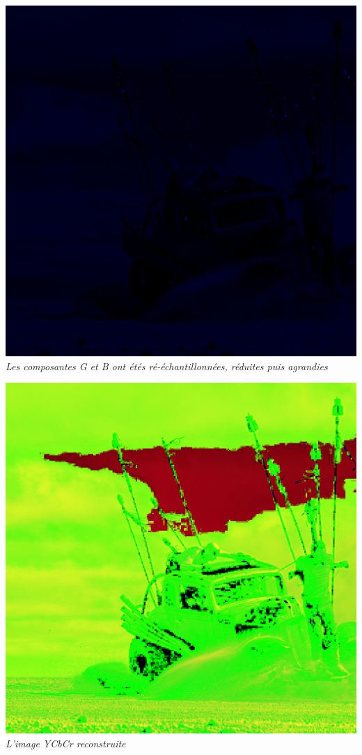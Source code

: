 \documentclass[a4paper,11pt]{article}
\begin{document}
\begin{center}
\includegraphics[scale=0.2]{./imgs/madmaxY3B.png}\\
\textit{Les composantes G et B ont étés ré-échantillonnées, réduites puis agrandies}
\end{center}

\begin{center}
\includegraphics[scale=0.5]{./imgs/madmaxYCompRGB.png}\\
\textit{L'image YCbCr reconstruite}
\end{center}
\end{document}

